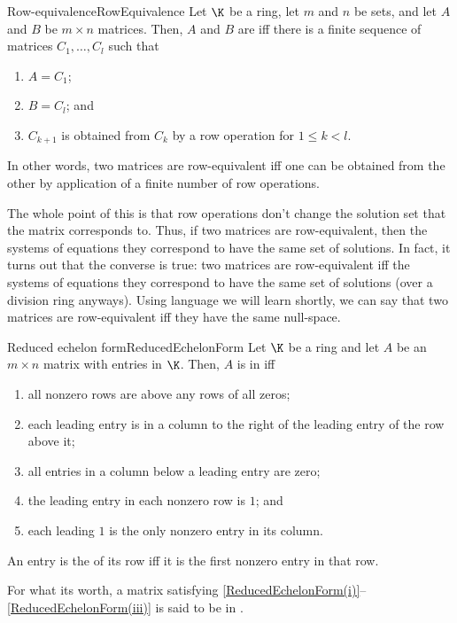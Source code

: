 \begin{dfn}{Row-equivalence}{RowEquivalence}
	Let $\K$ be a ring, let $m$ and $n$ be sets, and let $A$ and $B$ be $m\times n$ matrices.  Then, $A$ and $B$ are  iff there is a finite sequence of matrices $C_1,\ldots ,C_l$ such that
	\begin{enumerate}
		\item $A=C_1$;
		\item $B=C_l$; and
		\item $C_{k+1}$ is obtained from $C_k$ by a row operation for $1\leq k<l$.
	\end{enumerate}
	\begin{rmk}
		In other words, two matrices are row-equivalent iff one can be obtained from the other by application of a finite number of row operations.
	\end{rmk}
	\begin{rmk}
		The whole point of this is that row operations don't change the solution set that the matrix corresponds to.  Thus, if two matrices are row-equivalent, then the systems of equations they correspond to have the same set of solutions.  In fact, it turns out that the converse is true:  two matrices are row-equivalent iff the systems of equations they correspond to have the same set of solutions (over a division ring anyways).  Using language we will learn shortly, we can say that two matrices are row-equivalent iff they have the same null-space.
	\end{rmk}
\end{dfn}
\begin{dfn}{Reduced echelon form}{ReducedEchelonForm}
	Let $\K$ be a ring and let $A$ be an $m\times n$ matrix with entries in $\K$.  Then, $A$ is in  iff
	\begin{enumerate}
		\item \label{ReducedEchelonForm(i)}all nonzero rows are above any rows of all zeros;
		\item \label{ReducedEchelonForm(ii)}each leading entry is in a column to the right of the leading entry of the row above it;
		\item \label{ReducedEchelonForm(iii)}all entries in a column below a leading entry are zero;
		\item \label{ReducedEchelonForm(iv)}the leading entry in each nonzero row is $1$; and
		\item \label{ReducedEchelonForm(v)}each leading $1$ is the only nonzero entry in its column.
	\end{enumerate}
	\begin{rmk}
		An entry is the  of its row iff it is the first nonzero entry in that row.
	\end{rmk}
	\begin{rmk}
		For what its worth, a matrix satisfying \cref{ReducedEchelonForm(i)}--\cref{ReducedEchelonForm(iii)} is said to be in \index{Echelon form}.
	\end{rmk}
\end{dfn}
